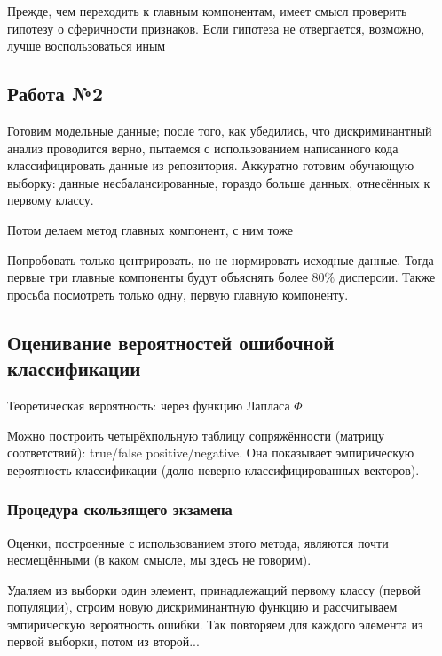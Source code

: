 \documentclass[main.tex]{subfiles}
\begin{document}
Прежде, чем переходить к главным компонентам, имеет смысл проверить гипотезу о сферичности признаков.
Если гипотеза не отвергается, возможно, лучше воспользоваться иным

\subsection{Работа №2}

Готовим модельные данные; после того, как убедились, что дискриминантный анализ проводится верно, пытаемся с использованием написанного кода классифицировать данные из репозитория.
Аккуратно готовим обучающую выборку: данные несбалансированные, гораздо больше данных, отнесённых к первому классу.

Потом делаем метод главных компонент, с ним тоже

Попробовать только центрировать, но не нормировать исходные данные.
Тогда первые три главные компоненты будут объяснять более $ 80\% $ дисперсии.
Также просьба посмотреть только одну, первую главную компоненту.

\subsection{Оценивание вероятностей ошибочной классификации}

Теоретическая вероятность: через функцию Лапласа $ \Phi $

Можно построить четырёхпольную таблицу сопряжённости (матрицу соответствий): true/false positive/negative.
Она показывает эмпирическую вероятность классификации (долю неверно классифицированных векторов).

\subsubsection{Процедура скользящего экзамена}

Оценки, построенные с использованием этого метода, являются почти несмещёнными (в каком смысле, мы здесь не говорим).

Удаляем из выборки один элемент, принадлежащий первому классу (первой популяции), строим новую дискриминантную функцию и рассчитываем эмпирическую вероятность ошибки.
Так повторяем для каждого элемента из первой выборки, потом из второй... %
\end{document}
